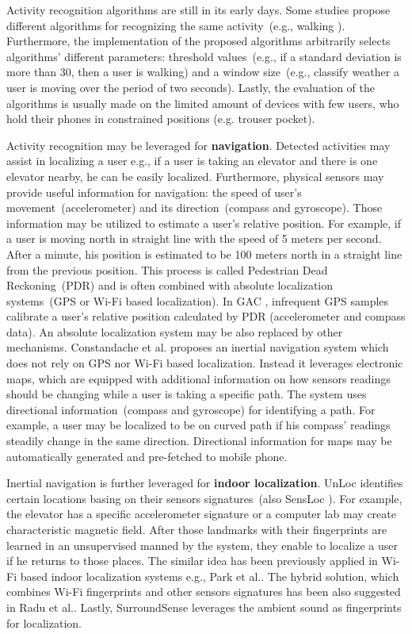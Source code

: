 Activity recognition algorithms are still in its early days. Some studies propose different algorithms for recognizing the same activity\ (e.g., walking \cite{benabdesslem:senseless} \cite{rachuri:socialsense} \cite{Kwapisz2011} ). Furthermore, the implementation of the proposed algorithms arbitrarily selects algorithms' different parameters: threshold values\ (e.g., if a standard deviation is more than 30, then a user is walking) and a window size\ (e.g., classify weather a user is moving over the period of two seconds). Lastly, the evaluation of the algorithms is usually made on the limited amount of devices with few users, who hold their phones in constrained positions (e.g. trouser pocket). 

Activity recognition may be leveraged for \textbf{navigation}. Detected activities may assist in localizing a user e.g., if a user is taking an elevator and there is one elevator nearby, he can be easily localized. Furthermore, physical sensors may provide useful information for navigation: the speed of user's movement\ (accelerometer) and its direction\ (compass and gyroscope). Those information may be utilized to estimate a user's relative position. For example, if a user is moving north in straight line with the speed of 5 meters per second. After a minute, his position is estimated to be 100 meters north in a straight line from the previous position.  This process is called Pedestrian Dead Reckoning\ (PDR) and is often combined with absolute localization systems\ (GPS or Wi-Fi based localization). In GAC \cite{youssef:gac}, infrequent GPS samples calibrate a user's relative position calculated by PDR (accelerometer and compass data). An absolute localization system may be also replaced by other mechanisms. Constandache et al.\cite{constandache:localization} proposes an inertial navigation system which does not rely on GPS nor Wi-Fi based localization. Instead it leverages electronic maps, which are equipped with additional information on how sensors readings should be changing while a user is taking a specific path. The system uses directional information\ (compass and gyroscope) for identifying a path. For example, a user may be localized to be on curved path if his compass' readings steadily change in the same direction. Directional information for maps may be automatically generated and pre-fetched to mobile phone.

Inertial navigation is further leveraged for \textbf{indoor localization}. UnLoc \cite{Wang:unsupervised} identifies certain locations basing on their sensors signatures\ (also SensLoc \cite{kim:sensloc} ). For example, the elevator has a specific accelerometer signature or a computer lab may create characteristic magnetic field. After those landmarks with their fingerprints are learned in an unsupervised manned by the system, they enable to localize a user if he returns to those places. The similar idea has been previously applied in Wi-Fi based indoor localization systems e.g., Park et al.\cite{park:organic}. The hybrid solution, which combines Wi-Fi fingerprints and other sensors signatures has been also suggested in Radu et al.\cite{radu:hybrid}. Lastly, SurroundSense \cite{azizyan:surroundsense} leverages the ambient sound as fingerprints for localization.

